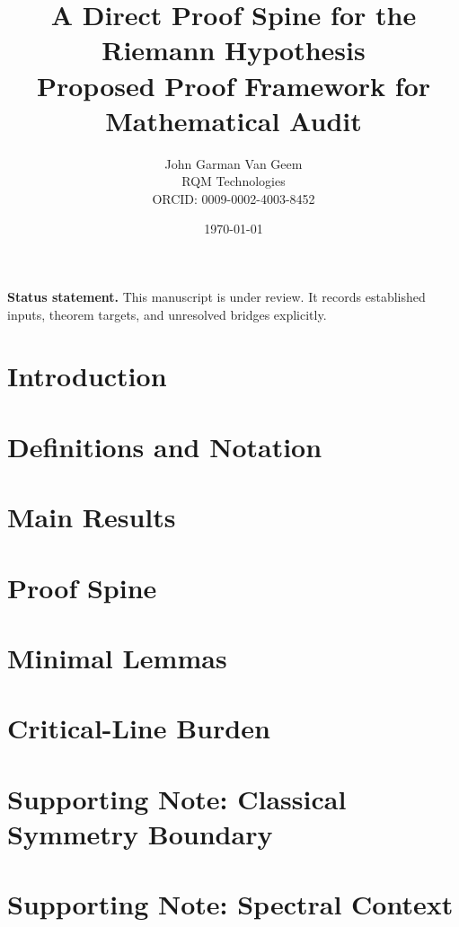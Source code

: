 \documentclass[11pt]{article}
\title{A Direct Proof Spine for the Riemann Hypothesis\\
\large Proposed Proof Framework for Mathematical Audit}
\author{John Garman Van Geem\\RQM Technologies\\ORCID: 0009-0002-4003-8452}
\date{\today}
\theoremstyle{plain}
\theoremstyle{definition}
\begin{document}
\maketitle

\begin{abstract}

\end{abstract}

\noindent\textbf{Status statement.} This manuscript is under review. It records established inputs, theorem targets, and unresolved bridges explicitly.

\tableofcontents
\newpage

\section{Introduction}


\section{Definitions and Notation}


\section{Main Results}


\section{Proof Spine}


\section{Minimal Lemmas}


\section{Critical-Line Burden}


\section{Supporting Note: Classical Symmetry Boundary}


\section{Supporting Note: Spectral Context}

\end{document}
